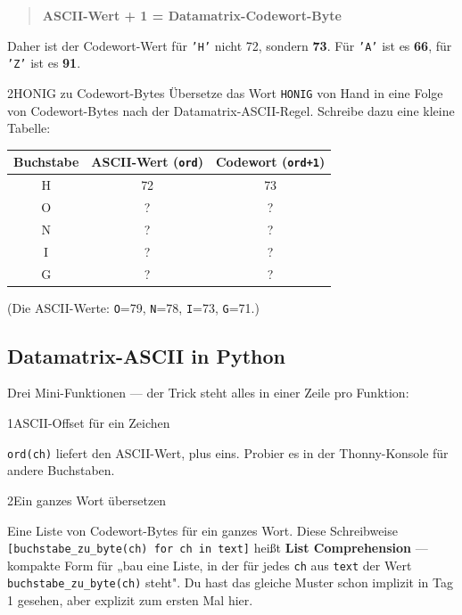 \begin{quote}
\textbf{ASCII-Wert + 1 = Datamatrix-Codewort-Byte}
\end{quote}

Daher ist der Codewort-Wert für \texttt{'H'} nicht 72, sondern
\textbf{73}. Für \texttt{'A'} ist es \textbf{66}, für \texttt{'Z'} ist
es \textbf{91}.

\begin{bleistiftuebung}{2}{HONIG zu Codewort-Bytes}
Übersetze das Wort \texttt{HONIG} von Hand in eine Folge von
Codewort-Bytes nach der Datamatrix-ASCII-Regel. Schreibe dazu eine
kleine Tabelle:

\begin{center}
\small
\begin{tabular}{c c c}
\toprule
Buchstabe & ASCII-Wert (\texttt{ord}) & Codewort (\texttt{ord+1}) \\
\midrule
H & 72 & 73 \\
O & ?  & ?  \\
N & ?  & ?  \\
I & ?  & ?  \\
G & ?  & ?  \\
\bottomrule
\end{tabular}
\end{center}

(Die ASCII-Werte: \texttt{O}=79, \texttt{N}=78, \texttt{I}=73,
\texttt{G}=71.)
\end{bleistiftuebung}

\subsection*{Datamatrix-ASCII in Python}

Drei Mini-Funktionen — der Trick steht alles in einer Zeile pro
Funktion:

\begin{pythoneinheit}{1}{ASCII-Offset für ein Zeichen}

\texttt{ord(ch)} liefert den ASCII-Wert, plus eins. Probier es in
der Thonny-Konsole für andere Buchstaben.
\end{pythoneinheit}

\begin{pythoneinheit}{2}{Ein ganzes Wort übersetzen}

Eine Liste von Codewort-Bytes für ein ganzes Wort. Diese Schreibweise
\texttt{[buchstabe\_zu\_byte(ch) for ch in text]} heißt
\textbf{List Comprehension} — kompakte Form für „bau eine Liste, in
der für jedes \texttt{ch} aus \texttt{text} der Wert
\texttt{buchstabe\_zu\_byte(ch)} steht". Du hast das gleiche Muster
schon implizit in Tag 1 gesehen, aber explizit zum ersten Mal hier.
\end{pythoneinheit}

